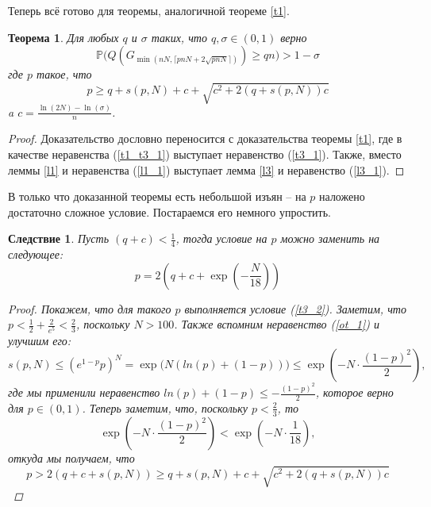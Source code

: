 \documentclass{matmex-diploma-custom}
\newcommand{\PRob}{\mathbb P}
\newcommand{\leqs}{\leqslant}
\newcommand{\geqs}{\geqslant}
\newtheorem{theorem}{Теорема}
\newtheorem{cons}{Следствие}
\theoremstyle{named}
\begin{document}
Теперь всё готово для теоремы, аналогичной теореме \ref{t1}.

\begin{theorem}\label{t3}
Для любых $q$ и $\sigma$ таких, что $q, \sigma \in (0,1)$ верно
\begin{equation}
\PRob\big(Q(G_{\min(nN, \lceil pnN + 2\sqrt{pnN} \rceil)}) \geqs qn\big) > 1 - \sigma
\end{equation}
где $p$ такое, что 
\begin{equation}\label{t3_2}
p \geqs q + s(p, N) + c + \sqrt{c^2+2(q+s(p, N))c}
\end{equation}
a $c = \frac{\ln(2N) - \ln(\sigma)}{n}$.
\end{theorem}
\begin{proof}
Доказательство дословно переносится с доказательства теоремы \ref{t1}, 
где в качестве неравенства (\ref{t1_t3_1}) выступает неравенство (\ref{t3_1}). 
Также, вместо леммы \ref{l1} и неравенства (\ref{l1_1}) выступает лемма \ref{l3} и неравенство (\ref{l3_1}).
\end{proof}

В только что доказанной теоремы есть небольшой изъян -- на $p$ наложено достаточно сложное условие. 
Постараемся его немного упростить.
\begin{cons}
Пусть $(q+c) < \frac{1}{4}$, тогда условие на $p$ можно заменить на следующее:
\begin{equation}
p = 2\left(q + c + \exp\left(-\frac{N}{18}\right) \right)
\end{equation}

\begin{proof}
Покажем, что для такого $p$ выполняется условие (\ref{t3_2}).
Заметим, что $p < \frac{1}{2} + \frac{2}{e^5} < \frac{2}{3}$, поскольку $N > 100$.
Также вспомним неравенство (\ref{ot_1}) и улучшим его:
\begin{equation}
s(p, N) \leqs (e^{1-p} p)^N 
	=
\exp\big(N( ln(p) + (1-p) )\big)
	\leqs
\exp\left( - N \cdot \frac{(1-p)^2}{2}\right),
\end{equation}
где мы применили неравенство $ln(p) + (1-p) \leqs - \frac{(1-p)^2}{2}$, которое верно для $p\in(0,1)$.
Теперь заметим, что, поскольку $p < \frac{2}{3}$, то 
\begin{equation}
\exp\left( - N \cdot \frac{(1-p)^2}{2}\right) < \exp\left( - N\cdot \frac{1}{18}\right),
\end{equation}
откуда мы получаем, что 
\begin{equation}
p > 2(q+c+s(p,N)) \geqs q + s(p, N) + c + \sqrt{c^2+2(q+s(p, N))c}
\end{equation}
\end{proof}
\end{cons}
\end{document}
